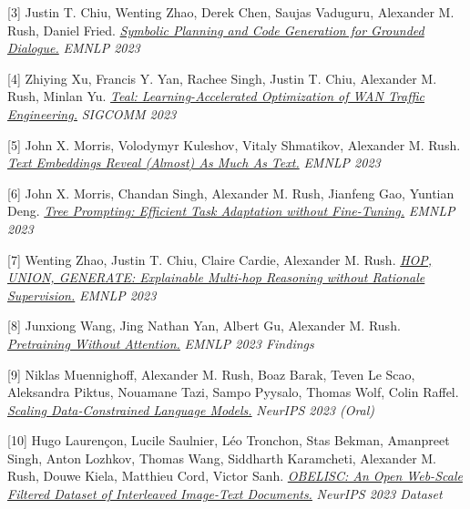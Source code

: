\documentclass[10pt]{article}
\begin{document}
\medskip


[3] \ind Justin T. Chiu, Wenting Zhao, Derek Chen, Saujas Vaduguru, Alexander M. Rush, Daniel Fried. \emph{\href{ https://arxiv.org/pdf/2310.17140.pdf }{ Symbolic Planning and Code Generation for Grounded Dialogue.} }\emph{ EMNLP 2023 }

\medskip


[4] \ind Zhiying Xu, Francis Y. Yan, Rachee Singh, Justin T. Chiu, Alexander M. Rush, Minlan Yu. \emph{\href{ https://arxiv.org/abs/2210.13763 }{ Teal: Learning-Accelerated Optimization of WAN Traffic Engineering.} }\emph{ SIGCOMM 2023 }

\medskip


[5] \ind John X. Morris, Volodymyr Kuleshov, Vitaly Shmatikov, Alexander M. Rush. \emph{\href{ https://arxiv.org/pdf/2310.06816.pdf }{ Text Embeddings Reveal (Almost) As Much As Text.} }\emph{ EMNLP 2023 }

\medskip


[6] \ind John X. Morris, Chandan Singh, Alexander M. Rush, Jianfeng Gao, Yuntian Deng. \emph{\href{ https://arxiv.org/pdf/2310.14034.pdf }{ Tree Prompting: Efficient Task Adaptation without Fine-Tuning.} }\emph{ EMNLP 2023 }

\medskip


[7] \ind Wenting Zhao, Justin T. Chiu, Claire Cardie, Alexander M. Rush. \emph{\href{ https://arxiv.org/pdf/2305.14237.pdf }{ HOP, UNION, GENERATE: Explainable Multi-hop Reasoning without Rationale Supervision.} }\emph{ EMNLP 2023 }

\medskip


[8] \ind Junxiong Wang, Jing Nathan Yan, Albert Gu, Alexander M. Rush. \emph{\href{ https://arxiv.org/pdf/2212.10544.pdf }{ Pretraining Without Attention.} }\emph{ EMNLP 2023 Findings }

\medskip


[9] \ind Niklas Muennighoff, Alexander M. Rush, Boaz Barak, Teven Le Scao, Aleksandra Piktus, Nouamane Tazi, Sampo Pyysalo, Thomas Wolf, Colin Raffel. \emph{\href{ https://arxiv.org/pdf/2305.16264.pdf }{ Scaling Data-Constrained Language Models.} }\emph{ NeurIPS 2023 (Oral) }

\medskip


[10] \ind Hugo Laurençon, Lucile Saulnier, Léo Tronchon, Stas Bekman, Amanpreet Singh, Anton Lozhkov, Thomas Wang, Siddharth Karamcheti, Alexander M. Rush, Douwe Kiela, Matthieu Cord, Victor Sanh. \emph{\href{ https://arxiv.org/pdf/2306.16527.pdf }{ OBELISC: An Open Web-Scale Filtered Dataset of Interleaved Image-Text Documents.} }\emph{ NeurIPS 2023 Dataset }
\end{document}
